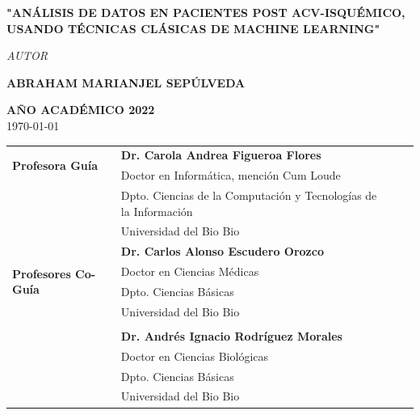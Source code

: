 \begin{frontmatter}
\begin{titlepage}
\begin{center}
			\begin{center}
				\begin{Huge}
				
					{\textbf{"{ANÁLISIS} DE DATOS EN PACIENTES POST ACV-ISQUÉMICO, USANDO TÉCNICAS CLÁSICAS DE MACHINE LEARNING"}}
					
				\end{Huge}
			\end{center}

			\vspace{3cm}
			\textit{\large AUTOR}\\[0.5cm]
			\begin{large}
				\textbf{\large ABRAHAM MARIANJEL SEPÚLVEDA}\\[1.5cm]
			\end{large}
				\textbf{AÑO ACADÉMICO 2022}\\[0.5cm]	
				{\large \today}
			
				\vfill
		\end{center}
	\end{titlepage}
	\newpage{\ }
	\thispagestyle{empty}
	\begin{flushleft}
	\doublespacing %
	\resizebox{15cm}{!} {
		\begin{tabular}{ l | l l l}
			\multirow{2}{2.8cm}{\textbf{\large Profesora Guía}} & { \textbf{\large Dr. Carola Andrea Figueroa Flores}}\\
			& { Doctor en Informática, mención Cum Loude}\\
			& { Dpto. Ciencias de la Computación y Tecnologías de la Información}\\
			\vspace{1.3cm}
			& { Universidad del Bio Bio}\\
			
			\multirow{4}{2.8cm}{\textbf{\large Profesores Co-Guía}} & { \textbf{\large Dr. Carlos Alonso Escudero Orozco}}\\
			& { Doctor en Ciencias Médicas}\\
			& { Dpto. Ciencias Básicas}\\
			& { Universidad del Bio Bio}\\
			\\
			&{ \textbf{\large Dr. Andrés Ignacio Rodríguez Morales}}\\
			& { Doctor en Ciencias Biológicas}\\
			& { Dpto. Ciencias Básicas}\\
			\vspace{1.3cm}
			& { Universidad del Bio Bio}\\
			

\end{tabular}}
\end{flushleft}
\end{frontmatter}
